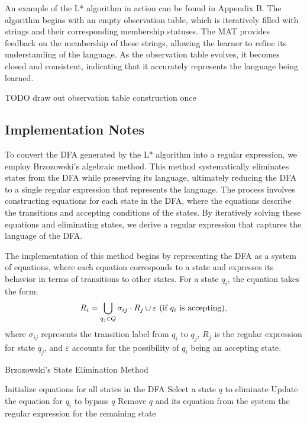 \indent\indent An example of the L* algorithm in action can be found in Appendix B. The algorithm begins with an empty observation table, which is iteratively filled with strings and their corresponding membership statuses. The MAT provides feedback on the membership of these strings, allowing the learner to refine its understanding of the language. As the observation table evolves, it becomes closed and consistent, indicating that it accurately represents the language being learned.

TODO draw out observation table construction once

\subsection{Implementation Notes}

\indent\indent To convert the DFA generated by the L* algorithm into a regular expression, we employ Brzozowski's algebraic method. This method systematically eliminates states from the DFA while preserving its language, ultimately reducing the DFA to a single regular expression that represents the language. The process involves constructing equations for each state in the DFA, where the equations describe the transitions and accepting conditions of the states. By iteratively solving these equations and eliminating states, we derive a regular expression that captures the language of the DFA.

\indent\indent The implementation of this method begins by representing the DFA as a system of equations, where each equation corresponds to a state and expresses its behavior in terms of transitions to other states. For a state \( q_i \), the equation takes the form:
\[
R_i = \bigcup_{q_j \in Q} \sigma_{ij} \cdot R_j \cup \varepsilon \text{ (if \( q_i \) is accepting)},
\]
where \( \sigma_{ij} \) represents the transition label from \( q_i \) to \( q_j \), \( R_j \) is the regular expression for state \( q_j \), and \( \varepsilon \) accounts for the possibility of \( q_i \) being an accepting state.

\begin{algorithm}
    \caption{Brzozowski's State Elimination Method}
    \label{alg:brzozowski}
    \begin{algorithmic}[1]
    \State Initialize equations for all states in the DFA
        \State Select a state \( q \) to eliminate
            \State Update the equation for \( q_i \) to bypass \( q \)
        \EndFor
        \State Remove \( q \) and its equation from the system
    \EndWhile
    \State \Return the regular expression for the remaining state
    \end{algorithmic}
\end{algorithm}

